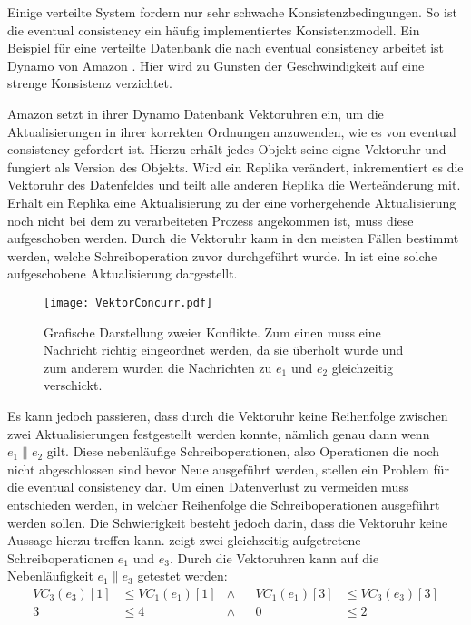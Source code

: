 Einige verteilte System fordern nur sehr schwache Konsistenzbedingungen.
So ist die eventual consistency ein häufig implementiertes Konsistenzmodell.
Ein Beispiel für eine verteilte Datenbank die nach eventual consistency arbeitet ist Dynamo von Amazon \cite{decandia2007dynamo}.
Hier wird zu Gunsten der Geschwindigkeit auf eine strenge Konsistenz verzichtet.

Amazon setzt in ihrer Dynamo Datenbank Vektoruhren ein, um die Aktualisierungen in ihrer korrekten Ordnungen anzuwenden, wie es von eventual consistency gefordert ist.
Hierzu erhält jedes Objekt seine eigne Vektoruhr und fungiert als Version des Objekts.
Wird ein Replika verändert, inkrementiert es die Vektoruhr des Datenfeldes und teilt alle anderen Replika die Werteänderung mit.
Erhält ein Replika eine Aktualisierung zu der eine vorhergehende Aktualisierung noch nicht bei dem zu verarbeiteten Prozess angekommen ist, muss diese aufgeschoben werden.
Durch die Vektoruhr kann in den meisten Fällen bestimmt werden, welche Schreiboperation zuvor durchgeführt wurde.
In  ist eine solche aufgeschobene Aktualisierung dargestellt.

\begin{figure}[ht]
    \centering
    \texttt{[image: VektorConcurr.pdf]}
    \caption[Aufheben von Nachrichten]{Grafische Darstellung zweier Konflikte. Zum einen muss eine Nachricht richtig eingeordnet werden, da sie überholt wurde und zum anderem wurden die Nachrichten zu $e_1$ und $e_2$ gleichzeitig verschickt.}
    \label{fig:vecConcurrent}
\end{figure} 

Es kann jedoch passieren, dass durch die Vektoruhr keine Reihenfolge zwischen zwei Aktualisierungen festgestellt werden konnte, nämlich genau dann wenn $e_1 \parallel e_2$ gilt.
Diese nebenläufige Schreiboperationen, also Operationen die noch nicht abgeschlossen sind bevor Neue ausgeführt werden, stellen ein Problem für die eventual consistency dar.
Um einen Datenverlust zu vermeiden muss entschieden werden, in welcher Reihenfolge die Schreiboperationen ausgeführt werden sollen.
Die Schwierigkeit besteht jedoch darin, dass die Vektoruhr keine Aussage hierzu treffen kann.
 zeigt zwei gleichzeitig aufgetretene Schreiboperationen $e_1$ und $e_3$.
Durch die Vektoruhren kann auf die Nebenläufigkeit $e_1 \parallel e_3$ getestet werden:
\begin{align*}
      VC_3(e_3)[1] & \leq VC_1(e_1)[1] & \wedge & & VC_1(e_1)[3] & \leq VC_3(e_3)[3] \\
         3         & \leq 4            & \wedge & & 0            & \leq 2
\end{align*}


